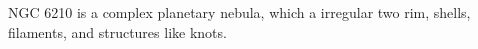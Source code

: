

NGC 6210 is a complex planetary nebula, which a irregular two rim, shells, filaments, and structures like knots. 